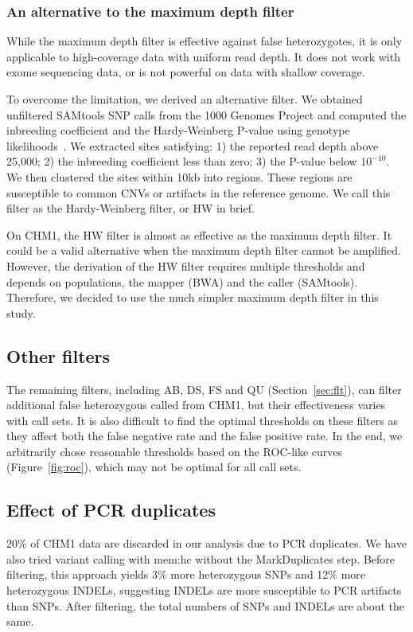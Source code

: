 \documentclass{bioinfo}
\begin{document}
\subsubsection{An alternative to the maximum depth filter}
While the maximum depth filter is effective against false heterozygotes, it is
only applicable to high-coverage data with uniform read depth. It
does not work with exome sequencing data, or is not powerful on data with
shallow coverage.

To overcome the limitation, we derived an alternative filter. We obtained
unfiltered SAMtools SNP calls from the 1000 Genomes Project and computed the
inbreeding coefficient and the Hardy-Weinberg P-value using genotype
likelihoods~\citep{Li:2011ab}. We extracted sites satisfying: 1) the reported
read depth above 25,000; 2) the inbreeding coefficient less than zero; 3) the
P-value below $10^{-10}$. We then clustered the sites within 10kb into regions.
These regions are susceptible to common CNVs or artifacts in the reference
genome. We call this filter as the Hardy-Weinberg filter, or HW in brief.

On CHM1, the HW filter is almost as effective as the maximum depth filter.
It could be a valid alternative when the maximum depth filter cannot be
amplified.  However, the derivation of the HW filter requires multiple
thresholds and depends on populations, the mapper (BWA) and the caller
(SAMtools). Therefore, we decided to use the much simpler maximum depth filter
in this study.

\subsection{Other filters}
The remaining filters, including AB, DS, FS and QU (Section~\ref{sec:flt}), can
filter additional false heterozygous called from CHM1, but their effectiveness
varies with call sets. It is also difficult to find the optimal thresholds on
these filters as they affect both the false negative rate and the false
positive rate. In the end, we arbitrarily chose reasonable thresholds based on
the ROC-like curves (Figure~\ref{fig:roc}), which may not be optimal for all
call sets.

\subsection{Effect of PCR duplicates}
20\% of CHM1 data are discarded in our analysis due to PCR duplicates. We have
also tried variant calling with mem:hc without the MarkDuplicates step. Before
filtering, this approach yields 3\% more heterozygous SNPs and 12\% more
heterozygous INDELs, suggesting INDELs are more susceptible to PCR artifacts
than SNPs. After filtering, the total numbers of SNPs and INDELs are about the
same.
\end{document}
